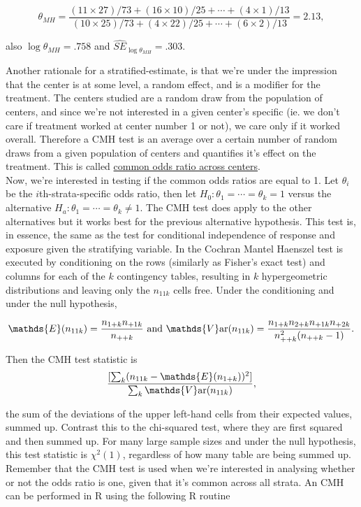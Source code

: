 \documentclass{homework}
\begin{document}
$$
\theta_{MH} = \frac{(11 \times 27)/73+(16 \times 10)/25+ \cdots + (4 \times 1)/13}{(10 \times 25)/73+(4 \times 22)/25+\cdots +(6 \times 2)/13} = 2.13,
$$

also $\log \theta_{MH} = .758$ and $\hat{SE}_{\log \theta_{MH}} = .303$. 

Another rationale for a stratified-estimate, is that we're under the impression that the center is at some level, a random effect, and is a modifier for the treatment. The centers studied are a random draw from the population of centers, and since we're not interested in a given center's specific (ie. we don't care if treatment worked at center number 1 or not), we care only if it worked overall. Therefore a CMH test is an average over a certain number of random draws from a given population of centers and quantifies it's effect on the treatment. This is called \underline{common odds ratio across centers}.\\

Now, we're interested in testing if the common odds ratios are equal to 1. Let $\theta_i$ be the $i$th-strata-specific odds ratio, then let $H_0 : \theta_1 = \cdots=\theta_k = 1$ versus the alternative $H_a : \theta_1 = \cdots=\theta_k \neq 1.$ The CMH test does apply to the other alternatives but it works best for the previous alternative hypothesis. This test is, in essence, the same as the test for conditional independence of response and exposure given the stratifying variable. In the Cochran Mantel Haenszel test is executed by conditioning on the rows (similarly as Fisher's exact test) and columns for each of the $k$ contingency tables, resulting in $k$ hypergeometric distributions and leaving only the $n_{11k}$ cells free. Under the conditioning and under the null hypothesis, 

\begin{align*}
    \mathds{E}(n_{11k}) = \frac{n_{1+k}n_{+1k}}{n_{++k}} \textnormal{ and } \mathds{V}\textnormal{ar}(n_{11k}) = \frac{n_{1+k}n_{2+k}n_{+1k}n_{+2k}}{n_{++k}^2(n_{++k}-1)}.
\end{align*}

Then the CMH test statistic is 
$$
\frac{[\sum_{k}(n_{11k}-\mathds{E}(n_{1+k}))^2]}{\sum_{k} \mathds{V}\textnormal{ar}(n_{11k})},
$$

the sum of the deviations of the upper left-hand cells from their expected values, summed up. Contrast this to the chi-squared test, where they are first squared and then summed up. For many large sample sizes and under the null hypothesis, this test statistic is $\chi^2(1)$, regardless of how many table are being summed up. Remember that the CMH test is used when we're interested in analysing whether or not the odds ratio is one, given that it's common across all strata. An CMH can be performed in R using the following R routine
\end{document}
